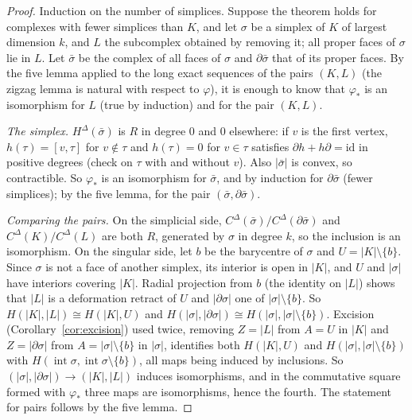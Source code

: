\begin{proof}
Induction on the number of simplices. Suppose the theorem holds for complexes with fewer simplices than $K$, and let $\sigma$ be a simplex of $K$ of largest dimension $k$, and $L$ the subcomplex obtained by
removing it; all proper faces of $\sigma$ lie in $L$. Let $\bar\sigma$ be the complex of all faces of $\sigma$ and $\partial\bar\sigma$ that of its proper faces. By the five lemma applied to the long exact sequences
of the pairs $(K,L)$ (the zigzag lemma is natural with respect to $\varphi$), it is enough to know that $\varphi_*$ is an isomorphism for $L$ (true by induction) and for the pair $(K,L)$.

\emph{The simplex.} $H^\Delta(\bar\sigma)$ is $R$ in degree $0$ and $0$ elsewhere: if $v$ is the first vertex, $h(\tau)=[v,\tau]$ for $v\notin\tau$ and $h(\tau)=0$ for $v\in\tau$ satisfies $\partial h+h\partial=\mathrm{id}$ in positive degrees
(check on $\tau$ with and without $v$). Also $|\bar\sigma|$ is convex, so contractible. So $\varphi_*$ is an isomorphism for $\bar\sigma$, and by induction for $\partial\bar\sigma$ (fewer simplices); by the five lemma, for the
pair $(\bar\sigma,\partial\bar\sigma)$.

\emph{Comparing the pairs.} On the simplicial side, $C^\Delta(\bar\sigma)/C^\Delta(\partial\bar\sigma)$ and $C^\Delta(K)/C^\Delta(L)$ are both $R$, generated by $\sigma$ in degree $k$, so the inclusion is an isomorphism.
On the singular side, let $b$ be the barycentre of $\sigma$ and $U=|K|\setminus\{b\}$. Since $\sigma$ is not a face of another simplex, its interior is open in $|K|$, and $U$ and $|\sigma|$ have interiors covering $|K|$.
Radial projection from $b$ (the identity on $|L|$) shows that $|L|$ is a deformation retract of $U$ and $|\partial\sigma|$ one of $|\sigma|\setminus\{b\}$. So $H(|K|,|L|)\cong H(|K|,U)$ and
$H(|\sigma|,|\partial\sigma|)\cong H(|\sigma|,|\sigma|\setminus\{b\})$. Excision (Corollary~\ref{cor:excision}) used twice, removing $Z=|L|$ from $A=U$ in $|K|$ and $Z=|\partial\sigma|$ from $A=|\sigma|\setminus\{b\}$ in $|\sigma|$,
identifies both $H(|K|,U)$ and $H(|\sigma|,|\sigma|\setminus\{b\})$ with $H(\operatorname{int}\sigma,\operatorname{int}\sigma\setminus\{b\})$, all maps being induced by inclusions. So $(|\sigma|,|\partial\sigma|)\to(|K|,|L|)$ induces isomorphisms, and in the commutative
square formed with $\varphi_*$ three maps are isomorphisms, hence the fourth. The statement for pairs follows by the five lemma.
\end{proof}

